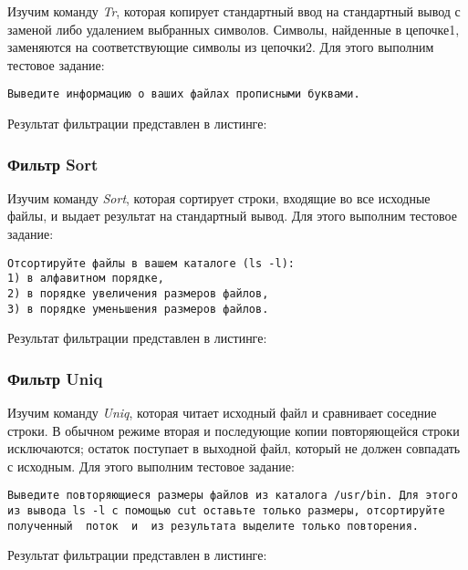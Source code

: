 \documentclass[14pt,a4paper,report]{report}
\begin{document}
Изучим команду \emph{Tr}, которая копирует стандартный ввод на стандартный вывод с заменой либо удалением выбранных символов.  Символы, найденные в цепочке1,  заменяются  на  соответствующие  символы из цепочки2. Для этого выполним тестовое задание:

\begin{verbatim}
Выведите информацию о ваших файлах прописными буквами.
\end{verbatim}

Результат фильтрации представлен в листинге:



\subsubsection{Фильтр Sort}

Изучим команду \emph{Sort}, которая сортирует строки,  входящие во все исходные файлы, и выдает результат на стандартный вывод. Для этого выполним тестовое задание:

\begin{verbatim}
Отсортируйте файлы в вашем каталоге (ls -l): 
1) в алфавитном порядке, 
2) в порядке увеличения размеров файлов, 
3) в порядке уменьшения размеров файлов.
\end{verbatim}

Результат фильтрации представлен в листинге:



\subsubsection{Фильтр Uniq}

Изучим команду \emph{Uniq}, которая   читает  исходный  файл  и сравнивает соседние строки. В обычном режиме вторая и последующие копии повторяющейся строки исключаются;  остаток поступает в выходной файл, который не должен совпадать с исходным. Для этого выполним тестовое задание:

\begin{verbatim}
Выведите повторяющиеся размеры файлов из каталога /usr/bin. Для этого из вывода ls -l с помощью cut оставьте только размеры, отсортируйте полученный  поток  и  из результата выделите только повторения.
\end{verbatim}

Результат фильтрации представлен в листинге:


\end{document}

